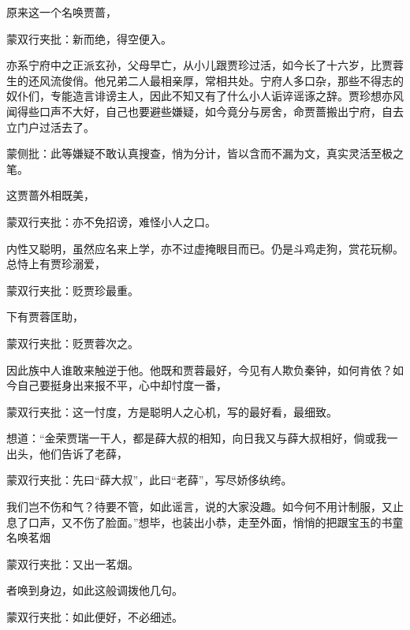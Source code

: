 \begin{parag}
    原来这一个名唤贾蔷，\begin{note}蒙双行夹批：新而绝，得空便入。\end{note}亦系宁府中之正派玄孙，父母早亡，从小儿跟贾珍过活，如今长了十六岁，比贾蓉生的还风流俊俏。他兄弟二人最相亲厚，常相共处。宁府人多口杂，那些不得志的奴仆们，专能造言诽谤主人，因此不知又有了什么小人诟谇谣诼之辞。贾珍想亦风闻得些口声不大好，自己也要避些嫌疑，如今竟分与房舍，命贾蔷搬出宁府，自去立门户过活去了。\begin{note}蒙侧批：此等嫌疑不敢认真搜查，悄为分计，皆以含而不漏为文，真实灵活至极之笔。\end{note}这贾蔷外相既美，\begin{note}蒙双行夹批：亦不免招谤，难怪小人之口。\end{note}内性又聪明，虽然应名来上学，亦不过虚掩眼目而已。仍是斗鸡走狗，赏花玩柳。总恃上有贾珍溺爱，\begin{note}蒙双行夹批：贬贾珍最重。\end{note}下有贾蓉匡助，\begin{note}蒙双行夹批：贬贾蓉次之。\end{note}因此族中人谁敢来触逆于他。他既和贾蓉最好，今见有人欺负秦钟，如何肯依？如今自己要挺身出来报不平，心中却忖度一番，\begin{note}蒙双行夹批：这一忖度，方是聪明人之心机，写的最好看，最细致。\end{note}想道：“金荣贾瑞一干人，都是薛大叔的相知，向日我又与薛大叔相好，倘或我一出头，他们告诉了老薛，\begin{note}蒙双行夹批：先曰“薛大叔”，此曰“老薛”，写尽娇侈纨绔。\end{note}我们岂不伤和气？待要不管，如此谣言，说的大家没趣。如今何不用计制服，又止息了口声，又不伤了脸面。”想毕，也装出小恭，走至外面，悄悄的把跟宝玉的书童名唤茗烟\begin{note}蒙双行夹批：又出一茗烟。\end{note}者唤到身边，如此这般调拨他几句。\begin{note}蒙双行夹批：如此便好，不必细述。\end{note}
\end{parag}


